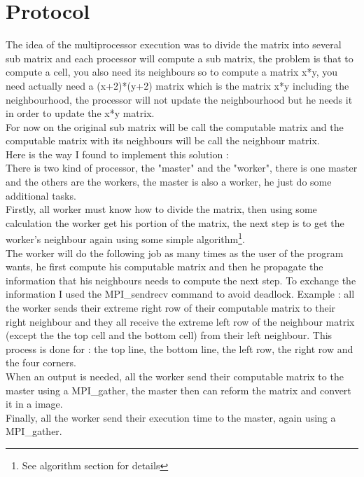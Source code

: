 \documentclass[a4paper,12pt]{article}
\begin{document}
\section{Protocol}
The idea of the multiprocessor execution was to divide the matrix into several sub matrix and each processor will compute a sub matrix, the problem is that to compute a cell, you also need its neighbours so to compute a matrix x*y, you need actually need a (x+2)*(y+2) matrix which is the matrix x*y including the neighbourhood, the processor will not update the neighbourhood but he needs it in order to update the x*y matrix.\\
For now on the original sub matrix will be call the computable matrix and the computable matrix with its neighbours will be call the neighbour matrix.\\
Here is the way I found to implement this solution :\\
There is two kind of processor, the "master" and the "worker", there is one master and the others are the workers, the master is also a worker, he just do some additional tasks.\\
Firstly, all worker must know how to divide the matrix, then using some calculation the worker get his portion of the matrix, the next step is to get the worker's neighbour again using some simple algorithm\footnote{See algorithm section for details}.\\
The worker will do the following job as many times as the user of the program wants, he first compute his computable matrix and then he propagate the information that his neighbours needs to compute the next step. To exchange the information I used the MPI\_sendrecv command to avoid deadlock. Example : all the worker sends their extreme right row of their computable matrix to their right neighbour and they all receive the extreme left row of the neighbour matrix (except the the top cell and the bottom cell) from their left neighbour. This process is done for : the top line, the bottom line, the left row, the right row and the four corners.\\
When an output is needed, all the worker send their computable matrix to the master using a MPI\_gather, the master then can reform the matrix and convert it in a image.\\
Finally, all the worker send their execution time to the master, again using a MPI\_gather.
\end{document}
